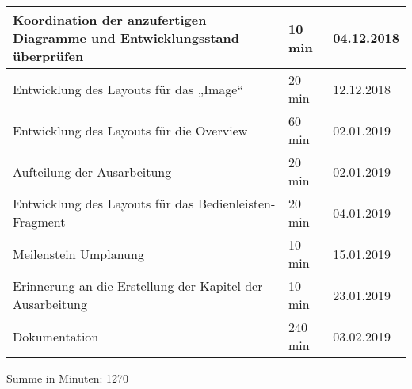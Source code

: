 \begin{longtable}{|p{10cm}|p{2cm}|p{2cm}|}
Koordination der anzufertigen Diagramme und Entwicklungsstand überprüfen& 10 min & 04.12.2018 \\ \hline
Entwicklung des Layouts für das „Image“ & 20 min & 12.12.2018 \\ \hline
Entwicklung des Layouts für die Overview &  60 min & 02.01.2019 \\ \hline
Aufteilung der Ausarbeitung & 20 min & 02.01.2019 \\ \hline
Entwicklung des Layouts für das Bedienleisten-Fragment & 20 min & 04.01.2019 \\ \hline
Meilenstein Umplanung & 10 min & 15.01.2019 \\ \hline
Erinnerung an die Erstellung der Kapitel der Ausarbeitung & 10 min & 23.01.2019 \\ \hline
Dokumentation & 240 min & 03.02.2019 \\ \hline
\end{longtable}
Summe in Minuten: 1270

\newpage
